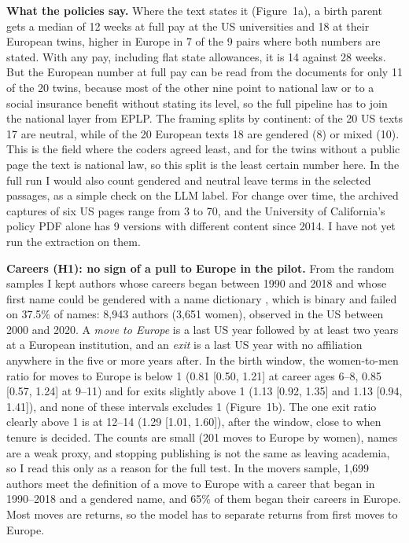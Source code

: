 \documentclass[10pt,twocolumn]{article}
\begin{document}
\textbf{What the policies say.} Where the text states it (Figure~1a), a birth parent gets a median of 12 weeks at full pay at the US universities and 18 at their European twins, higher in Europe in 7 of the 9 pairs where both numbers are stated. With any pay, including flat state allowances, it is 14 against 28 weeks. But the European number at full pay can be read from the documents for only 11 of the 20 twins, because most of the other nine point to national law or to a social insurance benefit without stating its level, so the full pipeline has to join the national layer from EPLP. The framing splits by continent: of the 20 US texts 17 are neutral, while of the 20 European texts 18 are gendered (8) or mixed (10). This is the field where the coders agreed least, and for the twins without a public page the text is national law, so this split is the least certain number here. In the full run I would also count gendered and neutral leave terms in the selected passages, as a simple check on the LLM label. For change over time, the archived captures of six US pages range from 3 to 70, and the University of California's policy PDF alone has 9 versions with different content since 2014. I have not yet run the extraction on them.

\textbf{Careers (H1): no sign of a pull to Europe in the pilot.} From the random samples I kept authors whose careers began between 1990 and 2018 and whose first name could be gendered with a name dictionary \citep{genderguesser}, which is binary and failed on 37.5\% of names: 8,943 authors (3,651 women), observed in the US between 2000 and 2020. A \emph{move to Europe} is a last US year followed by at least two years at a European institution, and an \emph{exit} is a last US year with no affiliation anywhere in the five or more years after. In the birth window, the women-to-men ratio for moves to Europe is below 1 (0.81 [0.50, 1.21] at career ages 6--8, 0.85 [0.57, 1.24] at 9--11) and for exits slightly above 1 (1.13 [0.92, 1.35] and 1.13 [0.94, 1.41]), and none of these intervals excludes 1 (Figure~1b). The one exit ratio clearly above 1 is at 12--14 (1.29 [1.01, 1.60]), after the window, close to when tenure is decided. The counts are small (201 moves to Europe by women), names are a weak proxy, and stopping publishing is not the same as leaving academia, so I read this only as a reason for the full test. In the movers sample, 1,699 authors meet the definition of a move to Europe with a career that began in 1990--2018 and a gendered name, and 65\% of them began their careers in Europe. Most moves are returns, so the model has to separate returns from first moves to Europe.
\end{document}
